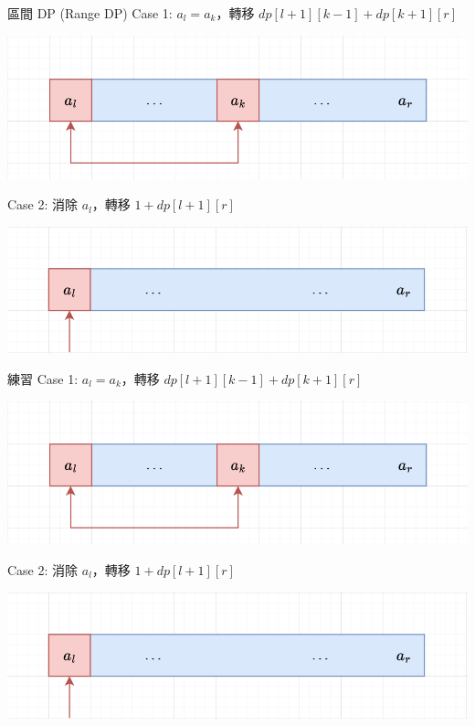 \documentclass[aspectratio=169]{beamer}
\begin{document}
\begin{frame}[fragile]{區間 DP (Range DP)}
    Case 1: $a_l = a_k$，轉移 $dp[l+1][k-1]+dp[k+1][r]$
    \begin{center}
        \includegraphics[scale=0.3]{images/Zuma_1.png}
    \end{center} \pause
    Case 2: 消除 $a_l$，轉移 $1+dp[l+1][r]$
    \begin{center}
        \includegraphics[scale=0.3]{images/Zuma_2.png}
    \end{center} 
\end{frame}

\begin{frame}[fragile]{練習}
    Case 1: $a_l = a_k$，轉移 $dp[l+1][k-1]+dp[k+1][r]$
    \begin{center}
        \includegraphics[scale=0.3]{images/Zuma_1.png}
    \end{center} \pause
    Case 2: 消除 $a_l$，轉移 $1+dp[l+1][r]$
    \begin{center}
        \includegraphics[scale=0.3]{images/Zuma_2.png}
    \end{center} 
\end{frame}
\end{document}
